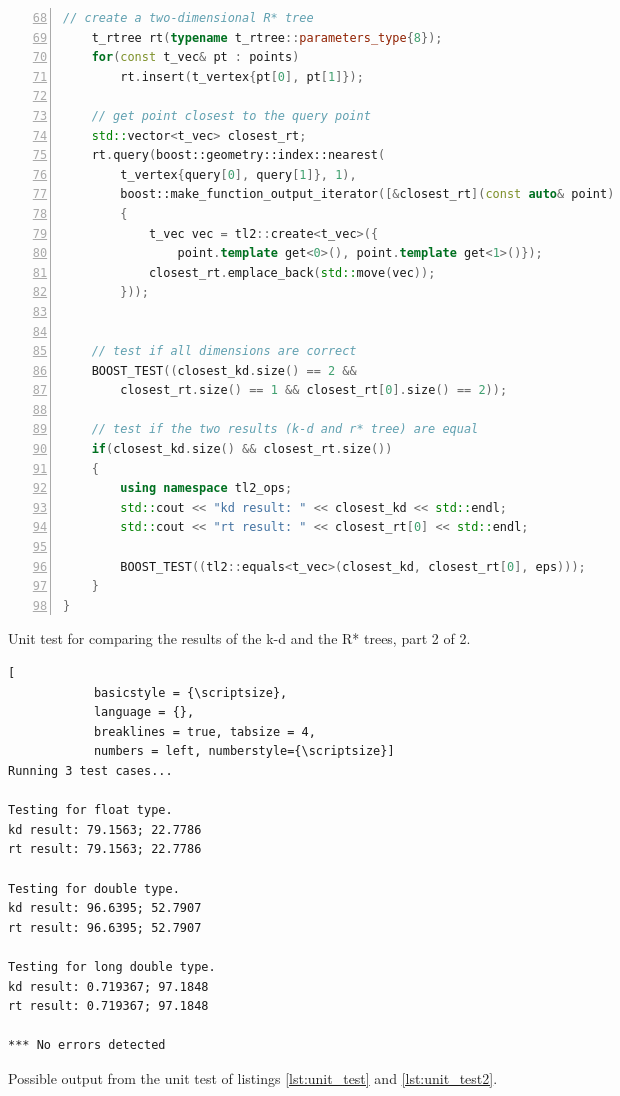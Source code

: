 \begin{listing}[htb]
	\begin{lstlisting}[language = C++,
			basicstyle = {\scriptsize},
			breaklines = true, tabsize = 4,
			numbers = left, firstnumber = 68, numberstyle={\scriptsize}]
	// create a two-dimensional R* tree
	t_rtree rt(typename t_rtree::parameters_type{8});
	for(const t_vec& pt : points)
		rt.insert(t_vertex{pt[0], pt[1]});

	// get point closest to the query point
	std::vector<t_vec> closest_rt;
	rt.query(boost::geometry::index::nearest(
		t_vertex{query[0], query[1]}, 1),
		boost::make_function_output_iterator([&closest_rt](const auto& point)
		{
			t_vec vec = tl2::create<t_vec>({
				point.template get<0>(), point.template get<1>()});
			closest_rt.emplace_back(std::move(vec));
		}));


	// test if all dimensions are correct
	BOOST_TEST((closest_kd.size() == 2 &&
		closest_rt.size() == 1 && closest_rt[0].size() == 2));

	// test if the two results (k-d and r* tree) are equal
	if(closest_kd.size() && closest_rt.size())
	{
		using namespace tl2_ops;
		std::cout << "kd result: " << closest_kd << std::endl;
		std::cout << "rt result: " << closest_rt[0] << std::endl;

		BOOST_TEST((tl2::equals<t_vec>(closest_kd, closest_rt[0], eps)));
	}
}
	\end{lstlisting}
	\caption[Unit test 2/2.]{Unit test for comparing the results of the k-d and the R* trees, part 2 of 2.
	\label{lst:unit_test2}}
\end{listing}


\begin{listing}[htb]
	\begin{lstlisting}[
			basicstyle = {\scriptsize},
			language = {},
			breaklines = true, tabsize = 4,
			numbers = left, numberstyle={\scriptsize}]
Running 3 test cases...

Testing for float type.
kd result: 79.1563; 22.7786
rt result: 79.1563; 22.7786

Testing for double type.
kd result: 96.6395; 52.7907
rt result: 96.6395; 52.7907

Testing for long double type.
kd result: 0.719367; 97.1848
rt result: 0.719367; 97.1848

*** No errors detected
	\end{lstlisting}
	\caption[Unit test output.]{Possible output from the unit test of listings \ref{lst:unit_test} and \ref{lst:unit_test2}.
	\label{lst:unit_test_output}}
\end{listing}
